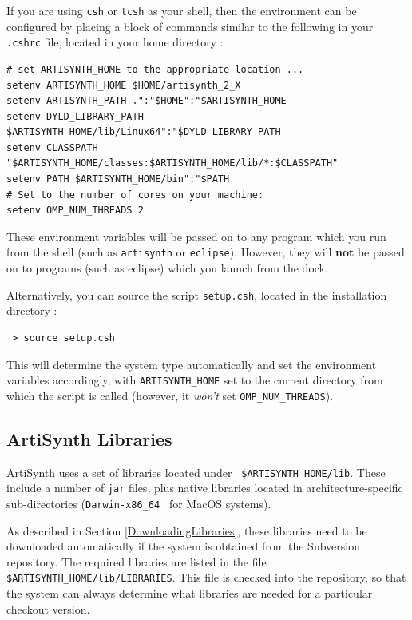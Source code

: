 \documentclass{article}
\def\SEP{/}
\def\FULLSYSTEM{MacOS }
\def\ARCH{Darwin-x86\_64 }
\def\directory{directory }
\def\directories{directories }
\begin{document}
If you are using {\tt csh} or {\tt tcsh} as your shell, then the
environment can be configured by placing a block of commands similar
to the following in your {\tt .cshrc} file, located in your home
\directory:

\begin{lstlisting}
# set ARTISYNTH_HOME to the appropriate location ...
setenv ARTISYNTH_HOME $HOME/artisynth_2_X
setenv ARTISYNTH_PATH .":"$HOME":"$ARTISYNTH_HOME
setenv DYLD_LIBRARY_PATH $ARTISYNTH_HOME/lib/Linux64":"$DYLD_LIBRARY_PATH
setenv CLASSPATH "$ARTISYNTH_HOME/classes:$ARTISYNTH_HOME/lib/*:$CLASSPATH"
setenv PATH $ARTISYNTH_HOME/bin":"$PATH
# Set to the number of cores on your machine:
setenv OMP_NUM_THREADS 2 
\end{lstlisting}

These environment variables will be passed on to any program which you
run from the shell (such as {\tt artisynth} or {\tt eclipse}). 
However, they will {\bf not} be passed on to programs (such as eclipse)
which you launch from the dock.

Alternatively, you can source the script {\tt setup.csh}, located in
the installation \directory:

\begin{verbatim}
 > source setup.csh
\end{verbatim}

This will determine the system type automatically and set the
environment variables accordingly, with {\tt ARTISYNTH\_HOME} set to the
current \directory from which the script is called (however,
it {\it won't} set {\tt OMP\_NUM\_THREADS}).

\subsection{ArtiSynth Libraries}

ArtiSynth uses a set of libraries located under {\tt
\$ARTISYNTH\_HOME\SEP lib}. These include a number of {\tt jar} files,
plus native libraries located in architecture-specific sub-\directories
({\tt \ARCH} for \FULLSYSTEM systems).

As described in Section \ref{DownloadingLibraries}, these libraries
need to be downloaded automatically if the system is obtained from the
Subversion repository. The required libraries are listed in the file
{\tt \$ARTISYNTH\_HOME\SEP lib\SEP LIBRARIES}. This file is checked
into the repository, so that the system can always determine what
libraries are needed for a particular checkout version.
\end{document}
